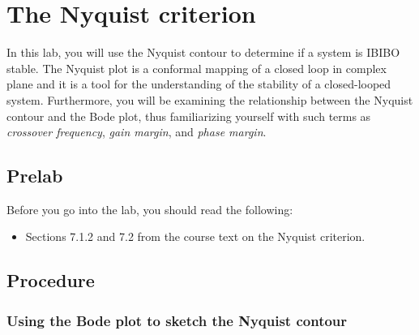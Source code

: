 \chapter{The Nyquist criterion}

In this lab, you will use the Nyquist contour to determine if a system is
IBIBO stable.  The Nyquist plot is a conformal mapping of a closed loop in
complex plane and it is a tool for the understanding of the stability of a
closed-looped system.  Furthermore, you will be examining the relationship
between the Nyquist contour and the Bode plot, thus familiarizing yourself
with such terms as \emph{crossover frequency}\@, \emph{gain margin}\@, and
\emph{phase margin}\@.

\section{Prelab}

Before you go into the lab, you should read the following:
\begin{itemize}
    \item Sections 7.1.2 and 7.2 from the course text on the Nyquist criterion.
\end{itemize}

\section{Procedure}

\subsection{Using the Bode plot to sketch the Nyquist
    contour}\label{sec:bodeNyquist}

